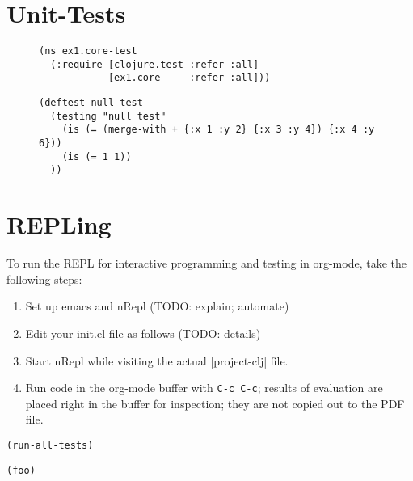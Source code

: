 \documentclass[11pt]{article}
\begin{document}
\section{Unit-Tests}
\label{sec-4}

\begin{figure}[H]
\label{test-namespace}
\begin{verbatim}
(ns ex1.core-test
  (:require [clojure.test :refer :all]
            [ex1.core     :refer :all]))
\end{verbatim}
\end{figure}

\begin{figure}[H]
\label{test-functions}
\begin{verbatim}
(deftest null-test
  (testing "null test"
    (is (= (merge-with + {:x 1 :y 2} {:x 3 :y 4}) {:x 4 :y 6}))
    (is (= 1 1))
  ))
\end{verbatim}
\end{figure}
\section{REPLing}
\label{sec-5}
\label{sec:emacs-repl}
To run the REPL for interactive programming and testing in org-mode,
take the following steps:
\begin{enumerate}
\item Set up emacs and nRepl (TODO: explain; automate)
\item Edit your init.el file as follows (TODO: details)
\item Start nRepl while visiting the actual |project-clj| file.
\item Run code in the org-mode buffer with \verb|C-c C-c|; results of
evaluation are placed right in the buffer for inspection; they are
not copied out to the PDF file.
\end{enumerate}

\begin{verbatim}
(run-all-tests)
\end{verbatim}

\begin{verbatim}
(foo)
\end{verbatim}
\end{document}
